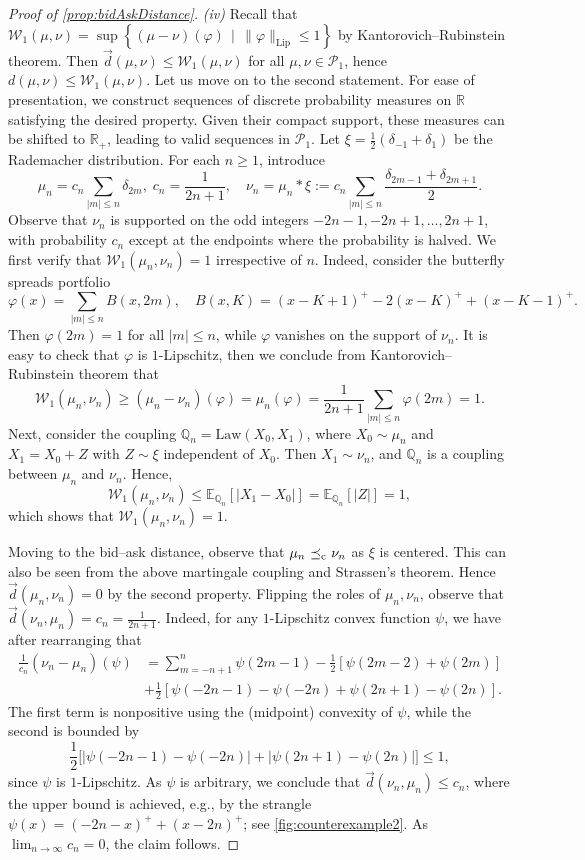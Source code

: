 \documentclass[11pt]{article}
\newcommand{\cP}{\mathcal{P}}
\newcommand{\cW}{\mathcal{W}}
\newcommand{\R}{\mathbb{R}} %
\newcommand{\Q}{\mathbb{Q}} %
\theoremstyle{plain}
\theoremstyle{definition}
\theoremstyle{remark}
\newcommand{\E}{\mathbb{E}}
\DeclareMathOperator{\cleq}{\,\preceq_{\rm c}\,}
\theoremstyle{plain}
\begin{document}
\begin{proof}[Proof of \cref{prop:bidAskDistance}]
%
%
%
%
%
%
%
%
%
%

%
\textit{(iv)} Recall  that $\cW_1(\mu,\nu) = \sup \left\{(\mu-\nu)(\varphi) \, \mid \, \lVert \varphi \rVert_{\text{Lip}} \le 1 \right\}$ by Kantorovich--Rubinstein theorem. Then  $\vec{d}(\mu,\nu) \le \cW_1(\mu,\nu) $ for all $\mu,\nu \in \cP_1$, hence $d(\mu,\nu) \le \cW_1(\mu,\nu)$. 
Let us move on to the second statement. For ease of presentation, we construct  sequences of discrete probability measures on $\R$ satisfying the desired property. Given their compact support, these measures can be shifted to $\mathbb{R}_+$, leading to  valid sequences in $\mathcal{P}_1$. Let $\xi = \frac{1}{2}(\delta_{-1} + \delta_1)$ be the Rademacher distribution. For each $n \ge 1$, introduce 
$$\mu_n = c_n \sum_{|m|\le n} \delta_{2m}, \; c_n = \frac{1}{2n+1}, \quad \nu_n = \mu_n * \xi := c_n \sum_{|m|\le n} \frac{\delta_{2m-1} + \delta_{2m+1}}{2}.$$
Observe that  $\nu_n$ is supported on the odd integers $-2n-1,-2n+1,\ldots,2n+1$, with probability $c_n$ except at the endpoints where the probability is halved. 
We first verify that $\cW_1(\mu_n,\nu_n) = 1$ irrespective of $n$. Indeed, consider the  butterfly spreads portfolio
$$\varphi(x) = \sum_{|m|\le n} B(x,2m), \quad B(x,K) = (x-K+1)^+ - 2(x-K)^+ + (x-K-1)^+.$$
Then $\varphi(2m) = 1$ for all $|m|\le n$, while $\varphi$ vanishes on the support of $\nu_n$. It is easy to check that $\varphi$ is $1$-Lipschitz, then we conclude from Kantorovich--Rubinstein theorem that 
$$\cW_1(\mu_n,\nu_n) \ge (\mu_n-\nu_n)(\varphi) = \mu_n(\varphi) = \frac{1}{2n+1}\sum_{|m|\le n} \varphi(2m) = 1. $$
Next, consider 
 the  coupling $\Q_n = \text{Law}(X_0,X_1)$, where $X_0\sim \mu_n$ and $X_1 = X_0 + Z$ with  $Z\sim \xi$  independent of $X_0$. Then $X_1\sim \nu_n$, and $\Q_n$ is a coupling between $\mu_n$ and $\nu_n$. Hence, 
 $$\cW_1(\mu_n,\nu_n) \le \E_{\Q_n}[|X_1 - X_0|] =\E_{\Q_n}[|Z|] = 1,$$
which shows that $\cW_1(\mu_n,\nu_n) = 1$. 
 
Moving to the bid--ask distance, observe that $\mu_n \cleq \nu_n$ as $\xi$ is centered. This can also be seen from the above martingale coupling and Strassen's theorem. Hence $\vec{d}(\mu_n,\nu_n) = 0$ by the second property. Flipping the roles of $\mu_n,\nu_n$, observe that $\vec{d}(\nu_n,\mu_n) = c_n = \frac{1}{2n+1}$. Indeed, %
for any $1$-Lipschitz convex function $\psi$,  we have  after rearranging that 
\begin{align*}
   \frac{1}{c_n} (\nu_n-\mu_n)(\psi) &= \sum_{m = -n +1}^{n} \psi(2m-1) -  \frac{1}{2}[\psi(2m-2)+\psi(2m)] \\[1em]
   &+ \frac{1}{2}[\psi(-2n-1) - \psi(-2n) + \psi(2n+1) - \psi(2n)].
\end{align*}
The first term is nonpositive using the (midpoint) convexity of $\psi$, while the second is bounded by 
$$ \frac{1}{2}\big[|\psi(-2n-1) - \psi(-2n)| + |\psi(2n+1) - \psi(2n)|\big]\le 1, $$
since $\psi$ is $1$-Lipschitz. As $\psi$ is arbitrary, we conclude that $\vec{d}(\nu_n,\mu_n) \le c_n $, where the upper bound is achieved, e.g., by  the strangle  $\psi(x) = (-2n-x)^+ + (x-2n)^+$; see \cref{fig:counterexample2}. As $\lim_{n\to \infty}c_n = 0$, the claim follows. 



\end{proof}
\end{document}
